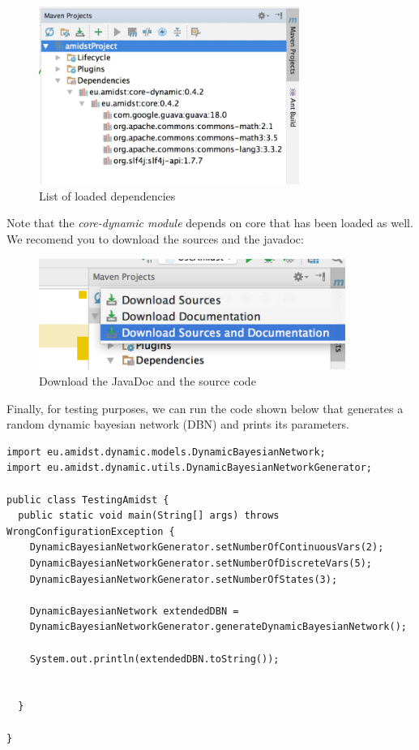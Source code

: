 \documentclass[10pt,a4paper]{article}
\begin{document}
\begin{figure}[h!]
	\centering
	\includegraphics[width=8.5cm]{img/use_amidst07.png}
	\caption{List of loaded dependencies}
	\label{fig:remoteDeps_mavenPanel}	
\end{figure}


\newpage 

Note that the \emph{core-dynamic module} depends on {core }{}that has
been loaded as well. We recomend you to download the sources and the
javadoc:



\begin{figure}[h!]
	\centering
	\includegraphics[width=10cm]{img/use_amidst08.png}
	\caption{Download the JavaDoc and  the source code}
	\label{fig:remoteDeps_downloadJD}	
\end{figure}




Finally, for testing purposes, we can run the code shown below that generates a random dynamic bayesian network (DBN) and prints its parameters.

\begin{verbatim}
import eu.amidst.dynamic.models.DynamicBayesianNetwork;
import eu.amidst.dynamic.utils.DynamicBayesianNetworkGenerator;

public class TestingAmidst {
  public static void main(String[] args) throws WrongConfigurationException {
    DynamicBayesianNetworkGenerator.setNumberOfContinuousVars(2);
    DynamicBayesianNetworkGenerator.setNumberOfDiscreteVars(5);
    DynamicBayesianNetworkGenerator.setNumberOfStates(3);

    DynamicBayesianNetwork extendedDBN = 
    DynamicBayesianNetworkGenerator.generateDynamicBayesianNetwork();    

    System.out.println(extendedDBN.toString());


  }

}

\end{verbatim}
\end{document}
